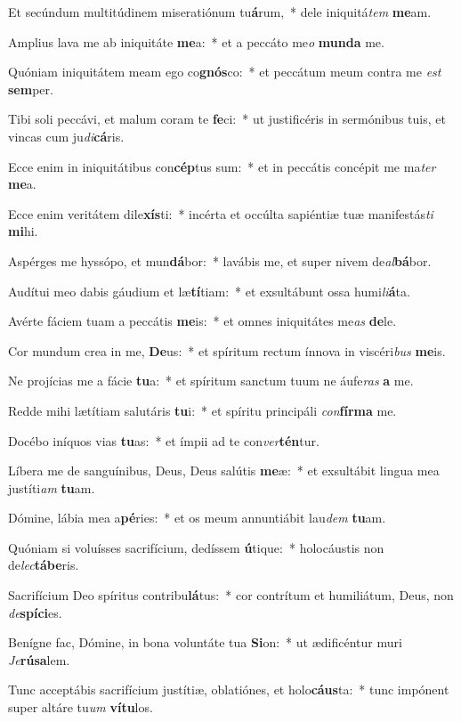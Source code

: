 \item Et secúndum multitúdinem miseratiónum tu\textbf{á}rum,~* dele iniquitá\textit{tem} \textbf{me}am.
\item Amplius lava me ab iniquitáte \textbf{me}a:~* et a peccáto me\textit{o} \textbf{mun}\textbf{da} me.
\item Quóniam iniquitátem meam ego co\textbf{gnós}co:~* et peccátum meum contra me \textit{est} \textbf{sem}per.
\item Tibi soli peccávi, et malum coram te \textbf{fe}ci:~* ut justificéris in sermónibus tuis, et vincas cum ju\textit{di}\textbf{cá}ris.
\item Ecce enim in iniquitátibus con\textbf{cép}tus sum:~* et in peccátis concépit me ma\textit{ter} \textbf{me}a.
\item Ecce enim veritátem dile\textbf{xís}ti:~* incérta et occúlta sapiéntiæ tuæ manifestás\textit{ti} \textbf{mi}hi.
\item Aspérges me hyssópo, et mun\textbf{dá}bor:~* lavábis me, et super nivem de\textit{al}\textbf{bá}bor.
\item Audítui meo dabis gáudium et læ\textbf{tí}tiam:~* et exsultábunt ossa humi\textit{li}\textbf{á}ta.
\item Avérte fáciem tuam a peccátis \textbf{me}is:~* et omnes iniquitátes me\textit{as} \textbf{de}le.
\item Cor mundum crea in me, \textbf{De}us:~* et spíritum rectum ínnova in viscéri\textit{bus} \textbf{me}is.
\item Ne projícias me a fácie \textbf{tu}a:~* et spíritum sanctum tuum ne áufe\textit{ras} \textbf{a} me.
\item Redde mihi lætítiam salutáris \textbf{tu}i:~* et spíritu principáli \textit{con}\textbf{fír}\textbf{ma} me.
\item Docébo iníquos vias \textbf{tu}as:~* et ímpii ad te con\textit{ver}\textbf{tén}tur.
\item Líbera me de sanguínibus, Deus, Deus salútis \textbf{me}æ:~* et exsultábit lingua mea justíti\textit{am} \textbf{tu}am.
\item Dómine, lábia mea a\textbf{pé}ries:~* et os meum annuntiábit lau\textit{dem} \textbf{tu}am.
\item Quóniam si voluísses sacrifícium, dedíssem \textbf{ú}tique:~* holocáustis non de\textit{lec}\textbf{tá}\textbf{be}ris.
\item Sacrifícium Deo spíritus contribu\textbf{lá}tus:~* cor contrítum et humiliátum, Deus, non \textit{de}\textbf{spí}\textbf{ci}es.
\item Benígne fac, Dómine, in bona voluntáte tua \textbf{Si}on:~* ut ædificéntur muri \textit{Je}\textbf{rú}\textbf{sa}lem.
\item Tunc acceptábis sacrifícium justítiæ, oblatiónes, et holo\textbf{cáus}ta:~* tunc impónent super altáre tu\textit{um} \textbf{ví}\textbf{tu}los.
